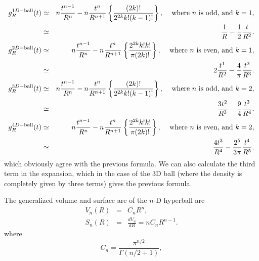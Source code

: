 \begin{eqnarray}
  \label{eq:ex_g(t)}
g^{1D-{\rm ball}}_R(t)
 & \simeq &                        
  n \frac{t^{n-1}}{R^n} - 
    n \frac{t^{n}}{R^{n+1}} 
   \left\{  \frac{(2k)! }{2^{2k} k! (k-1)!}  \right\},
                 \;\;\; \mbox{ where $n$ is odd, and } k=1,  \nonumber \\
 & \simeq &                          %
  \frac{1}{R} - 
    \frac{1}{2} \frac{t}{R^{2}}. 
                 \\
g^{2D-{\rm ball}}_R(t)
 & \simeq &                          %
  n \frac{t^{n-1}}{R^n} - 
    n \frac{t^{n}}{R^{n+1}} 
   \left\{ \frac{2^{2k} k! k!}{\pi (2k)!}  \right\},
                 \;\;\; \mbox{ where $n$ is even, and } k=1,  \nonumber \\
 & \simeq &                          %
  2 \frac{t^{1}}{R^2} - 
    \frac{4}{\pi} \frac{t^{2}}{R^{3}} .
                  \\
g^{3D-{\rm ball}}_R(t)
 & \simeq &                          %
  n \frac{t^{n-1}}{R^n} - 
    n \frac{t^{n}}{R^{n+1}} 
   \left\{ \frac{(2k)! }{2^{2k} k! (k-1)!}  \right\},
                 \;\;\; \mbox{ where $n$ is odd, and } k=2,  \nonumber \\
 & \simeq &                          %
  \frac{3 t^{2}}{R^3} - 
     \frac{9}{4} \frac{t^{3}}{R^{4}} .
   \\ 
g^{4D-{\rm ball}}_R(t)
 & \simeq &                          %
  n \frac{t^{n-1}}{R^n} -  
    n \frac{t^{n}}{R^{n+1}} 
   \left\{ \frac{2^{2k} k! k!}{\pi (2k)!} \right\},
                 \;\;\; \mbox{ where $n$ is even, and } k=2, \nonumber \\
 & \simeq &                          %
  \frac{4 t^{3}}{R^4} -  
    \frac{2^5}{3\pi} \frac{t^{4}}{R^{5}} .
\end{eqnarray}
which obviously agree with the previous formula. We can also calculate
the third term in the expansion, which in the case of the 3D ball
(where the density is completely given by three terms) gives the
previous formula.


The generalized volume and surface are of the $n$-D hyperball are
\begin{eqnarray}
 V_n(R) & = & C_n R^n,
  \label{eq:gen_vol} \\
 S_{n}(R) & = & \frac{dV_n}{dR} = n C_n R^{n-1}.
  \label{eq:gen_surf}
\end{eqnarray}
where
\begin{equation}
  \label{eq:cn}
   C_n = \frac{ \pi^{n/2} }{\Gamma(n/2 + 1)},
\end{equation}


